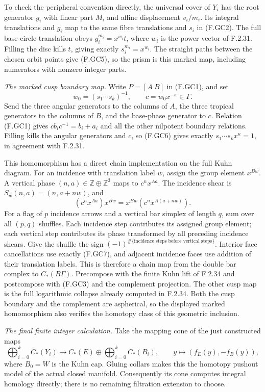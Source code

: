 To check the peripheral convention directly, the universal
cover of $Y_i$ has the root generator $g_i$ with linear part
$M_i$ and affine displacement $v_i/m_i$.  Its integral
translations and $g_i$ map to the same fibre translations
and $s_i$ in (F.GC2).  The full base-circle translation obeys
$g_i^{m_i}=x^{w_i}t$, where $w_i$ is the power vector of
F.2.31.  Filling the disc kills $t$, giving exactly
$s_i^{m_i}=x^{w_i}$.  The straight paths between the chosen
orbit points give (F.GC5), so the prism is this marked map,
including numerators with nonzero integer parts.

\emph{The marked cusp boundary map.}
Write $P=[A\ B]$ in (F.GC1), and set
\[
 w_0=(s_1\cdots s_k)^{-1},\qquad
 c=w_0x^{-\kappa}\in\Gamma.
                                                               \tag{F.GC6}
\]
Send the three angular generators to the columns of $A$,
the three tropical generators to the columns of $B$, and
the base-phase generator to $c$.  Relation (F.GC1) gives
$c b_i c^{-1}=b_i+a_i$ and all the other nilpotent boundary
relations.  Filling kills the angular generators and $c$,
so (F.GC6) gives exactly
$s_1\cdots s_kx^\kappa=1$, in agreement with F.2.31.

This homomorphism has a direct chain implementation on the
full Kuhn diagram.  For an incidence with translation label
$w$, assign the group element $x^{Bw}$.  A vertical phase
$(n,a)\in\mathbb Z\oplus\mathbb Z^3$ maps to $c^nx^{Aa}$.
The incidence shear is $S_w(n,a)=(n,a+n w)$, and
\[
 (c^nx^{Aa})x^{Bw}=x^{Bw}(c^nx^{A(a+n w)}).                \tag{F.GC7}
\]
For a flag of $p$ incidence arrows and a vertical bar
simplex of length $q$, sum over all $(p,q)$ shuffles.
Each incidence step contributes its assigned group element;
each vertical step contributes its phase transformed by
all preceding incidence shears.  Give the shuffle the sign
$(-1)^{\#\{\text{incidence steps before vertical steps}\}}$.
Interior face cancellations use exactly (F.GC7), and adjacent
incidence faces use addition of their translation labels.
This is therefore a chain map from the double bar complex
to $C_*(B\Gamma)$.  Precompose with the finite Kuhn lift of
F.2.34 and postcompose with (F.GC3) and the complement
projection.  The other cusp map is the full logarithmic
collapse already computed in F.2.34.
Both the cusp boundary and the complement are aspherical,
so the displayed marked homomorphism also verifies the
homotopy class of this geometric inclusion.

\emph{The final finite integer calculation.}
Take the mapping cone of the just constructed maps
\[
 \bigoplus_{i=0}^k C_*(Y_i)\longrightarrow
 C_*(E)\oplus\bigoplus_{i=0}^k C_*(B_i),
 \qquad y\longmapsto(f_E(y),-f_B(y)),                     \tag{F.GC8}
\]
where $B_0=W$ is the Kuhn cap.  Gluing collars makes this
the homotopy pushout model of the actual closed manifold.
Consequently its cone computes integral homology directly;
there is no remaining filtration extension to choose.

